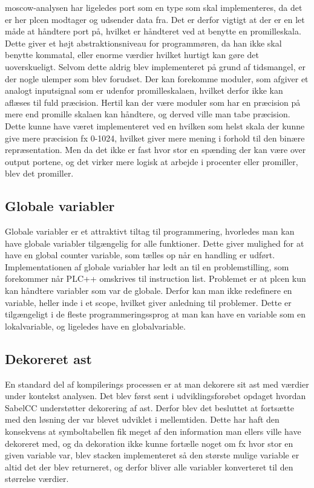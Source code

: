 \noindent \gls{moscow}-analysen har ligeledes port som en type som skal implementeres, da det er her \gls{plc}en modtager og udsender data fra.
Det er derfor vigtigt at der er en let måde at håndtere port på, hvilket er håndteret ved at benytte en promilleskala.
Dette giver et højt abstraktionsniveau for programmøren, da han ikke skal benytte kommatal, eller enorme værdier hvilket hurtigt kan gøre det uoverskueligt.
Selvom dette aldrig blev implementeret på grund af tidsmangel, er der nogle ulemper som blev forudset.
Der kan forekomme moduler, som afgiver et analogt inputsignal som er udenfor promilleskalaen, hvilket derfor ikke kan aflæses til fuld præcision. 
Hertil kan der være moduler som har en præcision på mere end promille skalaen kan håndtere, og derved ville man tabe præcision.
Dette kunne have været implementeret ved en hvilken som helst skala der kunne give mere præcision fx 0-1024, hvilket giver mere mening i forhold til den binære repræsentation. Men da det ikke er fast hvor stor en spænding der kan være over output portene, og det virker mere logisk at arbejde i procenter eller promiller, blev det promiller. 

\subsection*{Globale variabler}
Globale variabler er et attraktivt tiltag til programmering, hvorledes man kan have globale variabler tilgængelig for alle funktioner.
Dette giver mulighed for at have en global counter variable, som tælles op når en handling er udført.
Implementationen af globale variabler har ledt an til en problemstilling, som forekommer når PLC++ omskrives til instruction list. Problemet er at \gls{plc}en kun kan håndtere variabler som var de globale.
Derfor kan man ikke redefinere en variable, heller inde i et scope, hvilket giver anledning til problemer.
Dette er tilgængeligt i de fleste programmeringssprog at man kan have en variable som en lokalvariable, og ligeledes have en globalvariable.

\subsection*{Dekoreret \gls{ast}}
En standard del af kompilerings processen er at man dekorere sit \gls{ast} med værdier under kontekst analysen. Det blev først sent i udviklingsforøbet opdaget hvordan SabelCC understøtter dekorering af \gls{ast}. Derfor blev det besluttet at fortsætte med den løsning der var blevet udviklet i mellemtiden. Dette har haft den konsekvens at symboltabellen fik meget af den information man ellers ville have dekoreret med, og da dekoration ikke kunne fortælle noget om fx hvor stor en given variable var, blev stacken implementeret så den største mulige variable er altid det der blev returneret, og derfor bliver alle variabler konverteret til den størrelse værdier.

